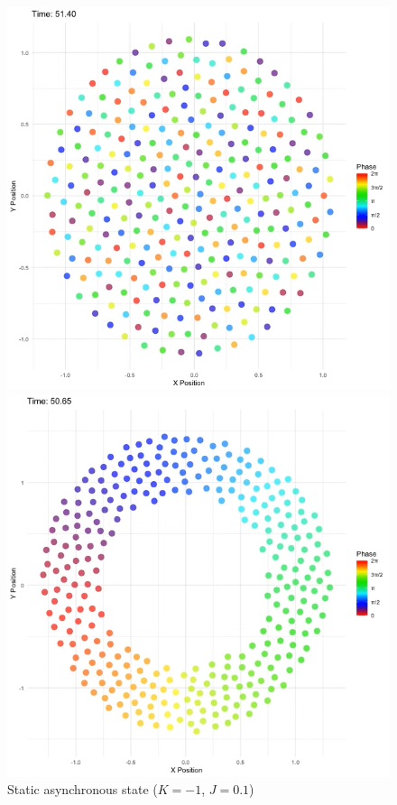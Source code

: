 \begin{figure}[p] %

    \begin{minipage}{\imagewidth}
        \centering
        \includegraphics[width=\textwidth]{images/task1/static_async.png}
        \caption{Static asynchronous state \newline ($K=-1$, $J=0.1$)}
        \label{fig:static_async}
    \end{minipage}
    \hfill
    \begin{minipage}{\imagewidth}
        \centering
  \includegraphics[width=\textwidth]{images/task1/static_phase_wave.png}

\end{minipage}
\end{figure}
